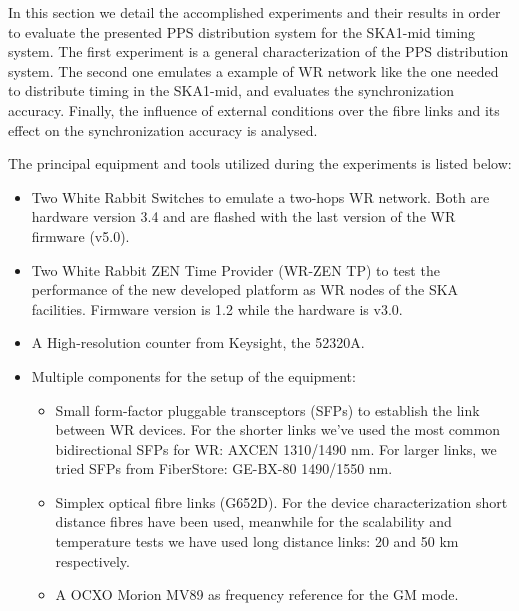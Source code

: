 
In this section we detail the accomplished experiments and their results in 
order to evaluate the presented PPS distribution system for the SKA1-mid timing 
system. The first experiment is a general characterization of the PPS 
distribution system. The second one emulates a example of WR network like the 
one needed to distribute timing in the SKA1-mid, and evaluates the 
synchronization accuracy. Finally, the influence of external conditions over 
the fibre links and its effect on the synchronization accuracy is analysed.

The principal equipment and tools utilized during the experiments is listed 
below:

\begin{itemize}
    \item Two White Rabbit Switches to emulate a two-hops WR network. Both are 
    hardware version 3.4 and are flashed with the last version of the WR 
    firmware (v5.0).
    
    \item Two White Rabbit ZEN Time Provider (WR-ZEN TP) to test the 
    performance of the new developed platform as WR nodes of the SKA 
    facilities. Firmware version is 1.2 while the hardware is v3.0.
    
    \item A High-resolution counter from Keysight, the 52320A.
    
    \item Multiple components for the setup of the equipment:
    \begin{itemize}
        \item Small form-factor pluggable transceptors (SFPs) to establish the 
        link between WR devices. For the shorter links we've used the most 
        common bidirectional SFPs for WR: AXCEN 1310/1490 nm. For larger links, 
        we tried 
        SFPs from FiberStore: GE-BX-80 1490/1550 nm.
        \item Simplex optical fibre links (G652D). For the device 
        characterization short distance fibres have been used, meanwhile for 
        the scalability and temperature tests we have used long distance links: 
        20 and 50 km respectively.
        \item A OCXO Morion MV89 as frequency reference for the GM mode.
    \end{itemize}
    
\end{itemize}

